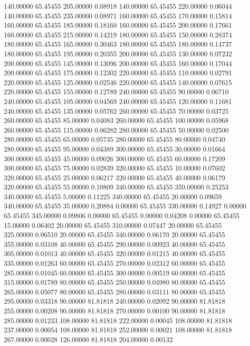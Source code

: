 140.00000 65.45455 205.00000 0.08918
140.00000 65.45455 220.00000 0.06044
140.00000 65.45455 235.00000 0.08971
160.00000 65.45455 170.00000 0.15814
160.00000 65.45455 185.00000 0.18160
160.00000 65.45455 200.00000 0.17661
160.00000 65.45455 215.00000 0.14219
180.00000 65.45455 150.00000 0.28374
180.00000 65.45455 165.00000 0.30463
180.00000 65.45455 180.00000 0.14737
180.00000 65.45455 195.00000 0.20355
200.00000 65.45455 130.00000 0.07232
200.00000 65.45455 145.00000 0.13096
200.00000 65.45455 160.00000 0.17044
200.00000 65.45455 175.00000 0.12302
220.00000 65.45455 110.00000 0.02791
220.00000 65.45455 125.00000 0.02546
220.00000 65.45455 140.00000 0.07615
220.00000 65.45455 155.00000 0.12789
240.00000 65.45455 90.00000 0.06710
240.00000 65.45455 105.00000 0.04569
240.00000 65.45455 120.00000 0.11681
240.00000 65.45455 135.00000 0.05762
260.00000 65.45455 70.00000 0.03725
260.00000 65.45455 85.00000 0.04083
260.00000 65.45455 100.00000 0.05968
260.00000 65.45455 115.00000 0.06282
280.00000 65.45455 50.00000 0.02500
280.00000 65.45455 65.00000 0.05735
280.00000 65.45455 80.00000 0.04740
280.00000 65.45455 95.00000 0.04389
300.00000 65.45455 30.00000 0.01664
300.00000 65.45455 45.00000 0.09026
300.00000 65.45455 60.00000 0.17209
300.00000 65.45455 75.00000 0.02839
320.00000 65.45455 10.00000 0.07602
320.00000 65.45455 25.00000 0.06217
320.00000 65.45455 40.00000 0.06179
320.00000 65.45455 55.00000 0.10809
340.00000 65.45455 350.00000 0.25253
340.00000 65.45455 5.00000 0.11225
340.00000 65.45455 20.00000 0.09659
340.00000 65.45455 35.00000 0.20884
0.00000 65.45455 330.00000 0.14927
0.00000 65.45455 345.00000 0.09806
0.00000 65.45455 0.00000 0.04208
0.00000 65.45455 15.00000 0.06402
20.00000 65.45455 310.00000 0.07447
20.00000 65.45455 325.00000 0.06510
20.00000 65.45455 340.00000 0.06170
20.00000 65.45455 355.00000 0.03108
40.00000 65.45455 290.00000 0.00923
40.00000 65.45455 305.00000 0.01013
40.00000 65.45455 320.00000 0.01215
40.00000 65.45455 335.00000 0.01263
60.00000 65.45455 270.00000 0.02312
60.00000 65.45455 285.00000 0.01045
60.00000 65.45455 300.00000 0.00519
60.00000 65.45455 315.00000 0.01789
80.00000 65.45455 250.00000 0.04980
80.00000 65.45455 265.00000 0.05077
80.00000 65.45455 280.00000 0.03111
80.00000 65.45455 295.00000 0.03318
90.00000 81.81818 240.00000 0.02092
90.00000 81.81818 255.00000 0.00208
90.00000 81.81818 270.00000 0.00100
90.00000 81.81818 285.00000 0.01233
108.00000 81.81818 222.00000 0.00045
108.00000 81.81818 237.00000 0.00054
108.00000 81.81818 252.00000 0.00021
108.00000 81.81818 267.00000 0.00028
126.00000 81.81818 204.00000 0.00132
